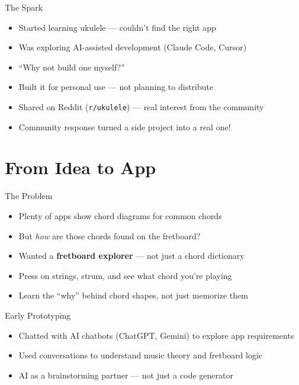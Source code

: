 \documentclass[aspectratio=169]{beamer}
\begin{document}
\begin{frame}{The Spark}
  \begin{itemize}
    \item Started learning ukulele --- couldn't find the right app
    \item Was exploring AI-assisted development (Claude Code, Cursor)
    \item ``Why not build one myself?''
    \item Built it for personal use --- not planning to distribute
    \item Shared on Reddit (\texttt{r/ukulele}) --- real interest from the community
    \item Community response turned a side project into a real one!
  \end{itemize}
\end{frame}

\section{From Idea to App}

\begin{frame}{The Problem}
  \begin{itemize}
    \item Plenty of apps show chord diagrams for common chords
    \item But \textit{how} are those chords found on the fretboard?
    \item Wanted a \textbf{fretboard explorer} --- not just a chord dictionary
    \item Press on strings, strum, and see what chord you're playing
    \item Learn the ``why'' behind chord shapes, not just memorize them
  \end{itemize}
\end{frame}

\begin{frame}{Early Prototyping}
  \begin{itemize}
    \item Chatted with AI chatbots (ChatGPT, Gemini) to explore app requirements
    \item Used conversations to understand music theory and fretboard logic
    \item AI as a brainstorming partner --- not just a code generator
  \end{itemize}
\end{frame}
\end{document}

